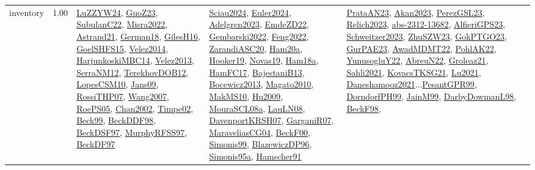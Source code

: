 {\begin{longtable}{p{3cm}r>{\raggedright\arraybackslash}p{6cm}>{\raggedright\arraybackslash}p{6cm}>{\raggedright\arraybackslash}p{8cm}}
\index{inventory}\index{Concepts!inventory}inventory &  1.00 & \hyperref[detail:LuZZYW24]{LuZZYW24}, \hyperref[detail:GuoZ23]{GuoZ23}, \hyperref[detail:SubulanC22]{SubulanC22}, \hyperref[detail:Misra2022]{Misra2022}, \hyperref[detail:Astrand21]{Astrand21}, \hyperref[detail:German18]{German18}, \hyperref[detail:GilesH16]{GilesH16}, \hyperref[detail:GoelSHFS15]{GoelSHFS15}, \hyperref[detail:Velez2014]{Velez2014}, \hyperref[detail:HarjunkoskiMBC14]{HarjunkoskiMBC14}, \hyperref[detail:Velez2013]{Velez2013}, \hyperref[detail:SerraNM12]{SerraNM12}, \hyperref[detail:TerekhovDOB12]{TerekhovDOB12}, \hyperref[detail:LopesCSM10]{LopesCSM10}, \hyperref[detail:Jans09]{Jans09}, \hyperref[detail:RossiTHP07]{RossiTHP07}, \hyperref[detail:Wang2007]{Wang2007}, \hyperref[detail:RoePS05]{RoePS05}, \hyperref[detail:Chan2002]{Chan2002}, \hyperref[detail:Timpe02]{Timpe02}, \hyperref[detail:Beck99]{Beck99}, \hyperref[detail:BeckDDF98]{BeckDDF98}, \hyperref[detail:BeckDSF97]{BeckDSF97}, \hyperref[detail:MurphyRFSS97]{MurphyRFSS97}, \hyperref[detail:BeckDF97]{BeckDF97} & \hyperref[detail:Sciau2024]{Sciau2024}, \hyperref[detail:Euler2024]{Euler2024}, \hyperref[detail:Adelgren2023]{Adelgren2023}, \hyperref[detail:EmdeZD22]{EmdeZD22}, \hyperref[detail:Gembarski2022]{Gembarski2022}, \hyperref[detail:Feng2022]{Feng2022}, \hyperref[detail:ZarandiASC20]{ZarandiASC20}, \hyperref[detail:Ham20a]{Ham20a}, \hyperref[detail:Hooker19]{Hooker19}, \hyperref[detail:Novas19]{Novas19}, \hyperref[detail:Ham18a]{Ham18a}, \hyperref[detail:HamFC17]{HamFC17}, \hyperref[detail:BajestaniB13]{BajestaniB13}, \hyperref[detail:Bocewicz2013]{Bocewicz2013}, \hyperref[detail:Magato2010]{Magato2010}, \hyperref[detail:MakMS10]{MakMS10}, \hyperref[detail:Hu2009]{Hu2009}, \hyperref[detail:MouraSCL08a]{MouraSCL08a}, \hyperref[detail:LauLN08]{LauLN08}, \hyperref[detail:DavenportKRSH07]{DavenportKRSH07}, \hyperref[detail:GarganiR07]{GarganiR07}, \hyperref[detail:MaraveliasCG04]{MaraveliasCG04}, \hyperref[detail:BeckF00]{BeckF00}, \hyperref[detail:Simonis99]{Simonis99}, \hyperref[detail:BlazewiczDP96]{BlazewiczDP96}, \hyperref[detail:Simonis95a]{Simonis95a}, \hyperref[detail:Hamscher91]{Hamscher91} & \hyperref[detail:PrataAN23]{PrataAN23}, \hyperref[detail:Akan2023]{Akan2023}, \hyperref[detail:PerezGSL23]{PerezGSL23}, \hyperref[detail:Relich2023]{Relich2023}, \hyperref[detail:abs-2312-13682]{abs-2312-13682}, \hyperref[detail:AlfieriGPS23]{AlfieriGPS23}, \hyperref[detail:Schweitzer2023]{Schweitzer2023}, \hyperref[detail:ZhuSZW23]{ZhuSZW23}, \hyperref[detail:GokPTGO23]{GokPTGO23}, \hyperref[detail:GurPAE23]{GurPAE23}, \hyperref[detail:AwadMDMT22]{AwadMDMT22}, \hyperref[detail:PohlAK22]{PohlAK22}, \hyperref[detail:YunusogluY22]{YunusogluY22}, \hyperref[detail:AbreuN22]{AbreuN22}, \hyperref[detail:Groleaz21]{Groleaz21}, \hyperref[detail:Sahli2021]{Sahli2021}, \hyperref[detail:KovacsTKSG21]{KovacsTKSG21}, \hyperref[detail:Lu2021]{Lu2021}, \hyperref[detail:Daneshamooz2021]{Daneshamooz2021}...\hyperref[detail:PesantGPR99]{PesantGPR99}, \hyperref[detail:DorndorfPH99]{DorndorfPH99}, \hyperref[detail:JainM99]{JainM99}, \hyperref[detail:DarbyDowmanL98]{DarbyDowmanL98}, \hyperref[detail:BeckF98]{BeckF98}, 
\end{longtable}}
